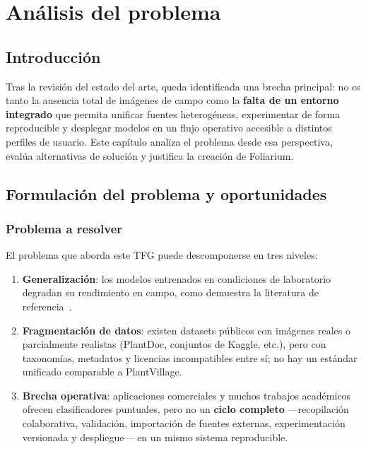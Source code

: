 \documentclass[11pt,spanish,listoffigures,listoftables]{tfgetsinf}
\begin{document}
\chapter{Análisis del problema}

\section{Introducción}

Tras la revisión del estado del arte, queda identificada una brecha principal: no es tanto la ausencia total de imágenes de campo como la \textbf{falta de un entorno integrado} que permita unificar fuentes heterogéneas, experimentar de forma reproducible y desplegar modelos en un flujo operativo accesible a distintos perfiles de usuario. Este capítulo analiza el problema desde esa perspectiva, evalúa alternativas de solución y justifica la creación de Foliarium.

\section{Formulación del problema y oportunidades}

\subsection{Problema a resolver}

El problema que aborda este TFG puede descomponerse en tres niveles:

\begin{enumerate}
    \item \textbf{Generalización}: los modelos entrenados en condiciones de laboratorio degradan su rendimiento en campo, como demuestra la literatura de referencia~\cite{mohanty2016,plantdoc2020}.
    \item \textbf{Fragmentación de datos}: existen datasets públicos con imágenes reales o parcialmente realistas (PlantDoc, conjuntos de Kaggle, etc.), pero con taxonomías, metadatos y licencias incompatibles entre sí; no hay un estándar unificado comparable a PlantVillage.
    \item \textbf{Brecha operativa}: aplicaciones comerciales y muchos trabajos académicos ofrecen clasificadores puntuales, pero no un \textbf{ciclo completo} ---recopilación colaborativa, validación, importación de fuentes externas, experimentación versionada y despliegue--- en un mismo sistema reproducible.
\end{enumerate}
\end{document}
